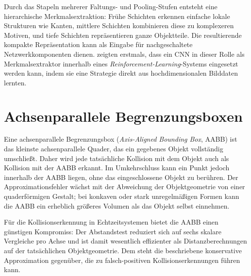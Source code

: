 Durch das Stapeln mehrerer Faltungs- und Pooling-Stufen entsteht eine hierarchische Merkmalsextraktion: Frühe Schichten erkennen einfache lokale Strukturen wie Kanten, mittlere Schichten kombinieren diese zu komplexeren Motiven, und tiefe Schichten repräsentieren ganze Objektteile. Die resultierende kompakte Repräsentation kann als Eingabe für nachgeschaltete Netzwerkkomponenten dienen. \textcite{mnihHumanlevelControlDeep2015} zeigten erstmals, dass ein CNN in dieser Rolle als Merkmalsextraktor innerhalb eines \textit{Reinforcement-Learning}-Systems eingesetzt werden kann, indem sie eine Strategie direkt aus hochdimensionalen Bilddaten lernten.

\section{Achsenparallele Begrenzungsboxen}
\label{sec:aabb}

Eine achsenparallele Begrenzungsbox (\textit{Axis-Aligned Bounding Box}, AABB) ist das kleinste achsenparallele Quader, das ein gegebenes Objekt vollständig umschließt. Daher wird jede tatsächliche Kollision mit dem Objekt auch als Kollision mit der AABB erkannt. Im Umkehrschluss kann ein Punkt jedoch innerhalb der AABB liegen, ohne das eingeschlossene Objekt zu berühren. Der Approximationsfehler wächst mit der Abweichung der Objektgeometrie von einer quaderförmigen Gestalt; bei konkaven oder stark unregelmäßigen Formen kann die AABB ein erheblich größeres Volumen als das Objekt selbst einnehmen.

Für die Kollisionserkennung in Echtzeitsystemen bietet die AABB einen günstigen Kompromiss: Der Abstandstest reduziert sich auf sechs skalare Vergleiche pro Achse und ist damit wesentlich effizienter als Distanzberechnungen auf der tatsächlichen Objektgeometrie. Dem steht die beschriebene konservative Approximation gegenüber, die zu falsch-positiven Kollisionserkennungen führen kann.